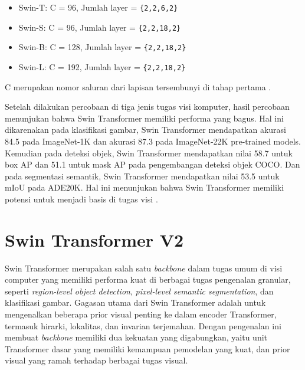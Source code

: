 \begin{itemize}[nolistsep]

  \item Swin-T: C = 96, Jumlah layer = \verb|{2,2,6,2}|

  \item Swin-S: C = 96, Jumlah layer = \verb|{2,2,18,2}|

  \item Swin-B: C = 128, Jumlah layer = \verb|{2,2,18,2}|

  \item Swin-L: C = 192, Jumlah layer = \verb|{2,2,18,2}|

\end{itemize}

C merupakan nomor saluran dari lapisan tersembunyi di tahap pertama \parencite{Liu2021}.

Setelah dilakukan percobaan di tiga jenis tugas visi komputer, hasil percobaan menunjukan bahwa Swin Transformer memiliki performa yang bagus. Hal ini dikarenakan pada klasifikasi gambar, Swin 
Transformer mendapatkan akurasi 84.5 pada ImageNet-1K dan akurasi 87.3 pada ImageNet-22K pre-trained models. Kemudian pada deteksi objek, Swin Transformer mendapatkan nilai 58.7 untuk box AP dan 51.1 
untuk mask AP pada pengembangan deteksi objek COCO. Dan pada segmentasi semantik, Swin Transformer mendapatkan nilai 53.5 untuk mIoU pada ADE20K. Hal ini menunjukan bahwa Swin Transformer memiliki potensi 
untuk menjadi basis di tugas visi \parencite{Liu2021}.

\section{Swin Transformer V2}
\label{sec:swintransformerv2}

Swin Transformer merupakan salah satu \emph{backbone} dalam tugas umum di visi computer yang memiliki performa kuat di berbagai tugas pengenalan granular, seperti \emph{region-level object detection}, 
\emph{pixel-level semantic segmentation}, dan klasifikasi gambar. Gagasan utama dari Swin Transformer adalah untuk mengenalkan beberapa prior visual penting ke dalam encoder Transformer, termasuk hirarki, 
lokalitas, dan invarian terjemahan. Dengan pengenalan ini membuat \emph{backbone} memiliki dua kekuatan yang digabungkan, yaitu unit Transformer dasar yang memiliki kemampuan pemodelan yang kuat, dan prior 
visual yang ramah terhadap berbagai tugas visual.\parencite{Liuv22021}

